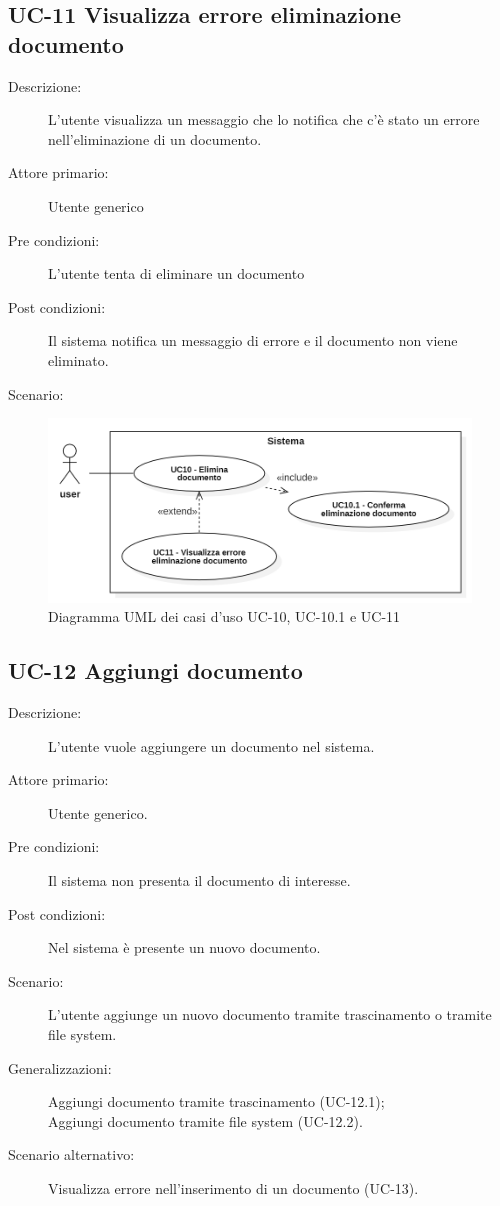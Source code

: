 \subsection{UC-11 Visualizza errore eliminazione documento}
\begin{description}
    \item[Descrizione:] L'utente visualizza un messaggio che lo notifica che c'è stato un errore nell'eliminazione di un documento.
    \item[Attore primario:] Utente generico
    \item[Pre condizioni:] L'utente tenta di eliminare un documento
    \item[Post condizioni:] Il sistema notifica un messaggio di errore e il documento non viene eliminato.
    \item[Scenario:] 
\end{description}

\begin{figure}[H]
    \centering
    \includegraphics[width=0.8\linewidth]{UC10-11.png}
    \caption{Diagramma UML dei casi d'uso UC-10, UC-10.1 e UC-11}
    \label{fig:UC10-11}
\end{figure}

\subsection{UC-12 Aggiungi documento}
\begin{description}
    \item[Descrizione:] L'utente vuole aggiungere un documento nel sistema.
    \item[Attore primario:] Utente generico.
    \item[Pre condizioni:] Il sistema non presenta il documento di interesse.
    \item[Post condizioni:] Nel sistema è presente un nuovo documento.
    \item[Scenario:] L'utente aggiunge un nuovo documento tramite trascinamento o tramite file system.
    \item[Generalizzazioni:] Aggiungi documento tramite trascinamento (UC-12.1);\\Aggiungi documento tramite file system (UC-12.2).
    \item[Scenario alternativo:] Visualizza errore nell'inserimento di un documento (UC-13).
\end{description}

